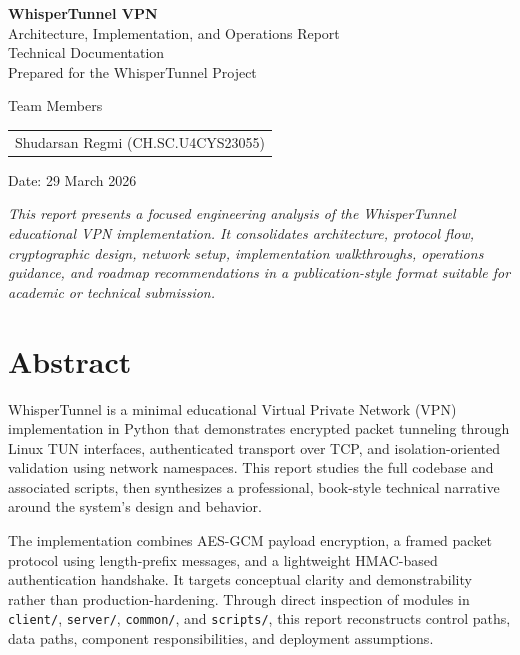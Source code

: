 \documentclass[11pt,oneside]{book}
\begin{document}
\frontmatter

\begin{titlepage}
\centering
{\Huge \textbf{WhisperTunnel VPN}\\[0.5em]}
{\LARGE Architecture, Implementation, and Operations Report\\[1.5em]}
{\large Technical Documentation\\}
\vfill
{\large Prepared for the WhisperTunnel Project\\[0.4em]}

{\large Team Members\\[0.3em]}
\begin{tabular}{c}
\large Shudarsan Regmi (CH.SC.U4CYS23055)
\end{tabular}

\vspace{0.6em}
{\large Date: 29 March 2026\\}
\vfill
\begin{minipage}{0.85\textwidth}
\centering
\textit{This report presents a focused engineering analysis of the WhisperTunnel educational VPN implementation. It consolidates architecture, protocol flow, cryptographic design, network setup, implementation walkthroughs, operations guidance, and roadmap recommendations in a publication-style format suitable for academic or technical submission.}
\end{minipage}
\end{titlepage}

\chapter*{Abstract}
WhisperTunnel is a minimal educational Virtual Private Network (VPN) implementation in Python that demonstrates encrypted packet tunneling through Linux TUN interfaces, authenticated transport over TCP, and isolation-oriented validation using network namespaces. This report studies the full codebase and associated scripts, then synthesizes a professional, book-style technical narrative around the system's design and behavior.

The implementation combines AES-GCM payload encryption, a framed packet protocol using length-prefix messages, and a lightweight HMAC-based authentication handshake. It targets conceptual clarity and demonstrability rather than production-hardening. Through direct inspection of modules in \texttt{client/}, \texttt{server/}, \texttt{common/}, and \texttt{scripts/}, this report reconstructs control paths, data paths, component responsibilities, and deployment assumptions.
\end{document}

